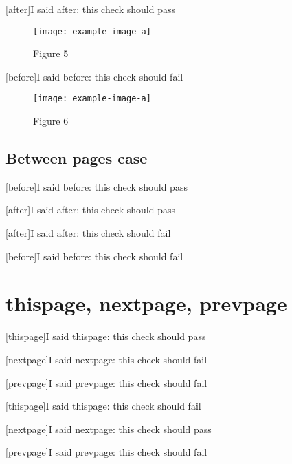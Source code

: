 \documentclass{book}
\begin{document}
[after]{I said after: this check should pass}

\begin{figure}
  \centering
  \caption{Figure 5}
  \texttt{[image: example-image-a]}
\end{figure}

\clearpage{}

[before]{I said before: this check should fail}

\begin{figure}[h]
  \centering
  \caption{Figure 6}
  \texttt{[image: example-image-a]}
\end{figure}

\section{Between pages case}

[before]{I said before: this check should pass}

[after]{I said after: this check should pass}

[after]{I said after: this check should fail}

[before]{I said before: this check should fail}

\clearpage{}


\chapter{thispage, nextpage, prevpage}

[thispage]{I said thispage: this check should pass}

[nextpage]{I said nextpage: this check should fail}

[prevpage]{I said prevpage: this check should fail}

[thispage]{I said thispage: this check should fail}

[nextpage]{I said nextpage: this check should pass}

[prevpage]{I said prevpage: this check should fail}
\end{document}
